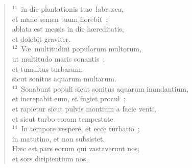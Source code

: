 \begin{verse}
${}^{11}$~in die plantationis tu\ae\ labrusca,\\ et mane semen tuum florebit~;\\ ablata est messis in die h\ae reditatis,\\ et dolebit graviter.\\
${}^{12}$~V\ae\ multitudini populorum multorum,\\ ut multitudo maris sonantis~;\\ et tumultus turbarum,\\ sicut sonitus aquarum multarum.\\
${}^{13}$~Sonabunt populi sicut sonitus aquarum inundantium,\\ et increpabit eum, et fugiet procul~;\\ et rapietur sicut pulvis montium a facie venti,\\ et sicut turbo coram tempestate.\\
${}^{14}$~In tempore vespere, et ecce turbatio~;\\ in matutino, et non subsistet.\\ H\ae c est pars eorum qui vastaverunt nos,\\ et sors diripientium nos.\end{verse}


